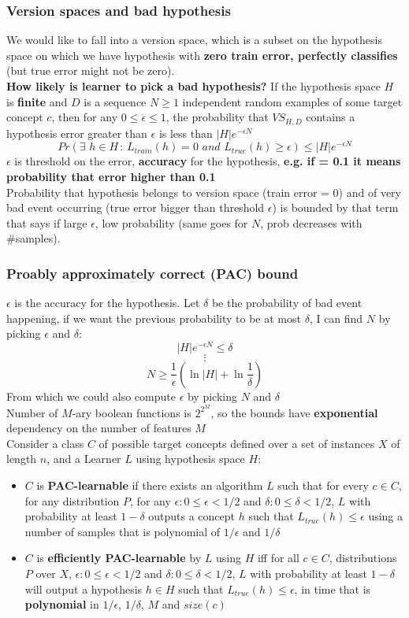 \subsubsection{Version spaces and bad hypothesis}
    We would like to fall into a version space, which is a subset on the hypothesis space on which we have hypothesis with \textbf{zero train error, perfectly classifies} (but true error might not be zero).\\
    \textbf{How likely is learner to pick a bad hypothesis?} If the hypothesis space $H$ is \textbf{finite} and $D$ is a sequence $N\geq 1$ independent random examples of some target concept $c$, then for any $0\leq\epsilon\leq 1$, the probability that $VS_{H,D}$ contains a hypothesis error greater than $\epsilon$ is less than $|H|e^{-\epsilon N}$
    $$Pr(\exists\,\,h\in H\,:\,L_{train}(h)=0\,\,and\,\,L_{true}(h)\geq\epsilon)\leq|H|e^{-\epsilon N}$$
    $\epsilon$ is threshold on the error, \textbf{accuracy} for the hypothesis, \textbf{e.g. if = 0.1 it means probability that error higher than 0.1}\\
    Probability that hypothesis belongs to version space (train error = 0) and of very bad event occurring (true error bigger than threshold $\epsilon$) is bounded by that term that says if large $\epsilon$, low probability (same goes for $N$, prob decreases with \#samples).
\subsubsection{Proably approximately correct (PAC) bound}
    $\epsilon$ is the accuracy for the hypothesis. Let $\delta$ be the probability of bad event happening, if we want the previous probability to be at most $\delta$, I can find $N$ by picking $\epsilon$ and $\delta$:
    $$|H|e^{-\epsilon N}\leq\delta$$
    $$\vdots$$
    $$N\geq\frac{1}{\epsilon}\left(\ln|H|+\ln\frac{1}{\delta}\right)$$
    From which we could also compute $\epsilon$ by picking $N$ and $\delta$\\
    Number of $M$-ary boolean functions is $2^{2^M}$, so the bounds have \textbf{exponential} dependency on the number of features $M$\\
    Consider a class $C$ of possible target concepts defined over a set of instances $X$ of length $n$, and a Learner $L$ using hypothesis space $H$:
    \begin{itemize}
        \item $C$ is \textbf{PAC-learnable} if there exists an algorithm $L$ such that for every $c\in C$, for any distribution $P$, for any $\epsilon:0\leq\epsilon<1/2$ and $\delta:0\leq\delta<1/2$, $L$ with probability at least $1-\delta$ outputs a concept $h$ such that $L_{true}(h)\leq\epsilon$ using a number of samples that is polynomial of $1/\epsilon$ and $1/\delta$
        \item $C$ is \textbf{efficiently PAC-learnable} by $L$ using $H$ iff for all $c\in C$, distributions $P$ over $X$, $\epsilon:0\leq\epsilon<1/2$ and $\delta:0\leq\delta<1/2$, $L$ with probability at least $1-\delta$ will output a hypothesis $h\in H$ such that $L_{true}(h)\leq\epsilon$, in time that is \textbf{polynomial} in $1/\epsilon$, $1/\delta$, $M$ and $size(c)$
    \end{itemize}
